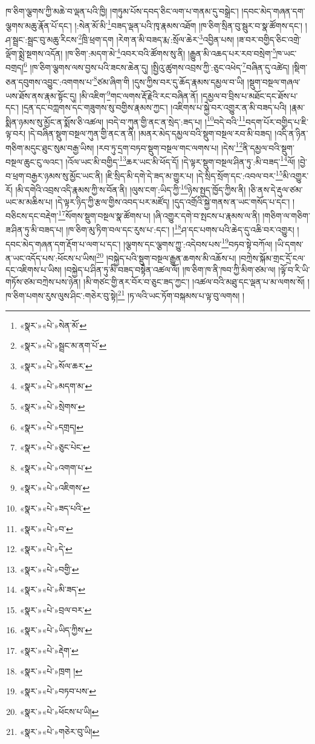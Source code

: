 ཁ་ཅིག་ལྕགས་ཀྱི་མཆེ་བ་ལྡན་པའི་ཁྱི། །གཏུམ་པོས་དབད་ཅིང་ལག་པ་གནམ་དུ་བསྒྲེང་། །དབང་མེད་གཞན་དག་ལྕགས་མཆུ་རྣོན་པོ་དང་། །:སེན་མོ་མི་\footnote{«སྣར་»«པེ་»སེན་མོ་}བཟད་ལྡན་པའི་ཁྭ་རྣམས་འཐོག །ཁ་ཅིག་སྲིན་བུ་སྦུར་བ་སྣ་ཚོགས་དང་། །ཤ་སྦྲང་:སྦྲང་བུ་མཆུ་རིངས་\footnote{«སྣར་»«པེ་»སྦྲང་མ་ནག་པོ་}ཁྲི་ཕྲག་དག །རེག་ན་མི་བཟད་རྨ་:སྲོལ་ཆེར་\footnote{«སྣར་»«པེ་»སོལ་ཆར་}འབྱིན་པས། །ཟ་བར་བགྱིད་ཅིང་འགྲེ་ལྡོག་སྨྲེ་སྔགས་འདོན། །ཁ་ཅིག་:མདག་མེ་\footnote{«སྣར་»«པེ་»མདག་མ་}འབར་བའི་ཚོགས་སུ་ནི། །རྒྱུན་མི་འཆད་པར་རབ་བསྲེག་\footnote{«སྣར་»«པེ་»སྲེགས་}ཁ་ཡང་བགྲད།\footnote{«སྣར་»«པེ་»དགྲད།} །ཁ་ཅིག་ལྕགས་ལས་བྱས་པའི་ཟངས་ཆེན་དུ། །སྤྱིའུ་ཚུགས་འབྲས་ཀྱི་:ཅུང་འཕེད་\footnote{«སྣར་»«པེ་»ཅུང་པེང་}བཞིན་དུ་འཚེད། །སྡིག་ཅན་དབུགས་འབྱུང་:འགགས་པ་\footnote{«སྣར་»«པེ་»འགག་པ་}ཙམ་ཞིག་གི །དུས་ཀྱིས་བར་དུ་ཆོད་རྣམས་དམྱལ་བ་ཡི། །སྡུག་བསྔལ་གཞལ་ཡས་ཐོས་ནས་རྣམ་སྟོང་དུ། །མི་འཇིག་\footnote{«སྣར་»«པེ་»འཇིགས་}གང་ལགས་རྡོ་རྗེའི་རང་བཞིན་ནོ། །དམྱལ་བ་བྲིས་པ་མཐོང་དང་ཐོས་པ་དང་། །དྲན་དང་བཀླགས་དང་གཟུགས་སུ་བགྱིས་རྣམས་ཀྱང་། །འཇིགས་པ་སྐྱེ་བར་འགྱུར་ན་མི་བཟད་པའི། །རྣམ་སྨིན་ཉམས་སུ་མྱོང་ན་སྨོས་ཅི་འཚལ། །བདེ་བ་ཀུན་གྱི་ནང་ན་སྲེད་:ཟད་པ། །\footnote{«སྣར་»«པེ་»ཟད་པའི་}བདེ་བའི་\footnote{«སྣར་»«པེ་»བ་}བདག་པོར་བགྱིད་པ་ཇི་ལྟ་བར། །དེ་བཞིན་སྡུག་བསྔལ་ཀུན་གྱི་ནང་ན་ནི། །མནར་མེད་དམྱལ་བའི་སྡུག་བསྔལ་རབ་མི་བཟད། །འདི་ན་ཉིན་གཅིག་མདུང་ཐུང་སུམ་བརྒྱ་ཡིས། །རབ་ཏུ་དྲག་བཏབ་སྡུག་བསྔལ་གང་ལགས་པ། །དེས་\footnote{«སྣར་»«པེ་»དེ་}ནི་དམྱལ་བའི་སྡུག་བསྔལ་ཆུང་ངུ་ལའང་། །འོལ་ཡང་མི་བགྱིད་\footnote{«སྣར་»«པེ་»བགྱི་}ཆར་ཡང་མི་ཕོད་དོ། །དེ་ལྟར་སྡུག་བསྔལ་ཤིན་ཏུ་:མི་བཟད་\footnote{«སྣར་»«པེ་»མི་ཟད་}ལོ། །བྱེ་བ་ཕྲག་བརྒྱར་ཉམས་སུ་མྱོང་ཡང་ནི། །ཇི་སྲིད་མི་དགེ་དེ་ཟད་མ་གྱུར་པ། །དེ་སྲིད་སྲོག་དང་:འབལ་བར་\footnote{«སྣར་»«པེ་»བྲལ་བར་}མི་འགྱུར་རོ། །མི་དགེའི་འབྲས་འདི་རྣམས་ཀྱི་ས་བོན་ནི། །ལུས་ངག་:ཡིད་ཀྱི་\footnote{«སྣར་»«པེ་»ཡིད་ཀྱིས་}ཉེས་སྤྱད་ཁྱོད་ཀྱིས་ནི། །ཅི་ནས་དེ་རྡུལ་ཙམ་ཡང་མ་མཆིས་པ། །དེ་ལྟར་ཉིད་ཀྱི་རྩལ་གྱིས་འབད་པར་མཛོད། །དུད་འགྲོའི་སྐྱེ་གནས་ན་ཡང་གསོད་པ་དང་། །བཅིངས་དང་བརྡེག་\footnote{«སྣར་»«པེ་»རྡེག་}སོགས་སྡུག་བསྔལ་སྣ་ཚོགས་པ། །ཞི་འགྱུར་དགེ་བ་སྤངས་པ་རྣམས་ལ་ནི། །གཅིག་ལ་གཅིག་ཟ་ཤིན་ཏུ་མི་བཟད་པ། །ཁ་ཅིག་མུ་ཏིག་བལ་དང་རུས་པ་:དང་། །\footnote{«སྣར་»«པེ་»ཁྲག །}ཤ་དང་པགས་པའི་ཆེད་དུ་འཆི་བར་འགྱུར། །དབང་མེད་གཞན་དག་རྡོག་པ་ལག་པ་དང་། །ལྕགས་དང་ལྕགས་ཀྱུ་:འདེབས་པས་\footnote{«སྣར་»«པེ་»བཏབ་པས་}བཏབ་སྟེ་བཀོལ། །ཡི་དགས་ན་ཡང་འདོད་པས་:ཕོངས་པ་ཡིས།\footnote{«སྣར་»«པེ་»ཕོངས་པ་ཡི།} །བསྐྱེད་པའི་སྡུག་བསྔལ་རྒྱུན་ཆགས་མི་འཆོས་པ། །བཀྲེས་སྐོམ་གྲང་དྲོ་ངལ་དང་འཇིགས་པ་ཡིས། །བསྐྱེད་པ་ཤིན་ཏུ་མི་བཟད་བསྟེན་འཚལ་ལོ། །ཁ་ཅིག་ཁ་ནི་ཁབ་ཀྱི་མིག་ཙམ་ལ། །ལྟོ་བ་རི་ཡི་གཏོས་ཙམ་བཀྲེས་པས་ཉེན། །མི་གཙང་གྱི་ནར་བོར་བ་ཅུང་ཟད་ཀྱང་། །འཚལ་བའི་མཐུ་དང་ལྡན་པ་མ་ལགས་སོ། །ཁ་ཅིག་པགས་རུས་ལུས་ཤིང་:གཅེར་བུ་སྟེ།\footnote{«སྣར་»«པེ་»གཅེར་བུ་ཡི།} །ཏ་ལའི་ཡང་ཏོག་བསྐམས་པ་ལྟ་བུ་ལགས། །
